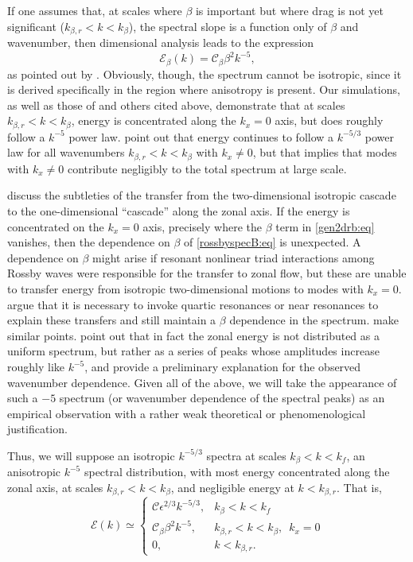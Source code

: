 \documentclass{jfm}
\newcommand{\ca}  [1]{\mathcal{#1}}
\begin{document}
If one assumes that, at scales where $\beta$ is important but where
drag is not yet significant ($k_{\beta,r}<k<k_{\beta}$), the spectral
slope is a function only of $\beta$ and wavenumber, then dimensional
analysis leads to the expression
\begin{equation}
\label{rossbyspecB:eq}
\ca{E}_\beta(k) = \ca{C}_{\beta} \beta^2 k^{-5},
\end{equation}
as pointed out by \citet{Rhines75}.  Obviously, though, the spectrum
cannot be isotropic, since it is derived specifically in the region
where anisotropy is present.  Our simulations, as well as those of
\citet{galperin01} and others cited above, demonstrate that at scales
$k_{\beta,r}<k<k_{\beta}$, energy is concentrated along the $k_x=0$
axis, but does roughly follow a $k^{-5}$ power law.
\citet{chekhlov96} point out that energy continues to follow a
$k^{-5/3}$ power law for all wavenumbers $k_{\beta,r}<k<k_{\beta}$
with $k_x \neq 0$, but that implies that modes with $k_x \neq 0$
contribute negligibly to the total spectrum at large scale.

\mbox{} \citet{smithwaleffe99} discuss the subtleties of the transfer from the
two-dimensional isotropic cascade to the one-dimensional ``cascade''
along the zonal axis.  If the energy is concentrated on the $k_x=0$
axis, precisely where the $\beta$ term in \eqref{gen2drb:eq} vanishes,
then the dependence on $\beta$ of \eqref{rossbyspecB:eq} is
unexpected.  A dependence on $\beta$ might arise if resonant nonlinear
triad interactions among Rossby waves were responsible for the
transfer to zonal flow, but these are unable to transfer energy from
isotropic two-dimensional motions to modes with $k_x =
0$. \citet{smithwaleffe99} argue that it is necessary to invoke
quartic resonances or near resonances to explain these transfers and
still maintain a $\beta$ dependence in the
spectrum. \citet{chekhlov96} make similar points.  \citet{danilov01b}
point out that in fact the zonal energy is not distributed as a
uniform spectrum, but rather as a series of peaks whose amplitudes
increase roughly like $k^{-5}$, and provide a preliminary explanation
for the observed wavenumber dependence.  Given all of the above, we
will take the appearance of such a $-5$ spectrum (or wavenumber
dependence of the spectral peaks) as an empirical observation with a
rather weak theoretical or phenomenological justification.

Thus, we will suppose an isotropic $k^{-5/3}$ spectra at scales
$k_{\beta}<k<k_f$, an anisotropic $k^{-5}$ spectral distribution, with most
energy concentrated along the zonal axis, at scales
$k_{\beta,r}<k<k_{\beta}$, and negligible energy at $k<k_{\beta,r}$. That
is,
\begin{equation}
\ca{E}(k) \simeq
\left\{\begin{array}{ll}
    \ca{C}\epsilon^{2/3}k^{-5/3},  &\mbox{$k_{\beta}<k<k_f$}   \\
    \ca{C}_{\beta} \beta^2 k^{-5}, &\mbox{$k_{\beta,r}<k<k_{\beta}$,
                                          ~$k_x=0$}\\
    0,                             &\mbox{$k<k_{\beta,r}$}.
\end{array}
\right.
\label{betaspectot:eq}
\end{equation}
\end{document}
